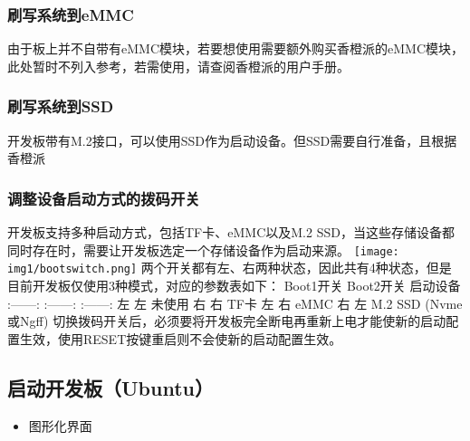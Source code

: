 \hypertarget{ux5237ux5199ux7cfbux7edfux5230emmc}{%
\subsubsection{刷写系统到eMMC}\label{ux5237ux5199ux7cfbux7edfux5230emmc}}

由于板上并不自带有eMMC模块，若要想使用需要额外购买香橙派的eMMC模块，此处暂时不列入参考，若需使用，请查阅香橙派的用户手册。

\hypertarget{ux5237ux5199ux7cfbux7edfux5230ssd}{%
\subsubsection{刷写系统到SSD}\label{ux5237ux5199ux7cfbux7edfux5230ssd}}

开发板带有M.2接口，可以使用SSD作为启动设备。但SSD需要自行准备，且根据香橙派

\hypertarget{ux8c03ux6574ux8bbeux5907ux542fux52a8ux65b9ux5f0fux7684ux62e8ux7801ux5f00ux5173}{%
\subsubsection{调整设备启动方式的拨码开关}\label{ux8c03ux6574ux8bbeux5907ux542fux52a8ux65b9ux5f0fux7684ux62e8ux7801ux5f00ux5173}}

开发板支持多种启动方式，包括TF卡、eMMC以及M.2
SSD，当这些存储设备都同时存在时，需要让开发板选定一个存储设备作为启动来源。
\texttt{[image: img1/bootswitch.png]}
两个开关都有左、右两种状态，因此共有4种状态，但是目前开发板仅使用3种模式，对应的参数表如下：
\textbar{} Boot1开关 \textbar{} Boot2开关 \textbar{} 启动设备 \textbar{}
\textbar{} :------: \textbar{} :------: \textbar{} :------: \textbar{}
\textbar{} 左 \textbar{} 左 \textbar{} 未使用 \textbar{} \textbar{} 右
\textbar{} 右 \textbar{} TF卡 \textbar{} \textbar{} 左 \textbar{} 右
\textbar{} eMMC \textbar{} \textbar{} 右 \textbar{} 左 \textbar{} M.2
SSD (Nvme或Ngff)\textbar{}
切换拨码开关后，必须要将开发板完全断电再重新上电才能使新的启动配置生效，使用RESET按键重启则不会使新的启动配置生效。

\hypertarget{ux542fux52a8ux5f00ux53d1ux677fubuntu}{%
\subsection{启动开发板（Ubuntu）}\label{ux542fux52a8ux5f00ux53d1ux677fubuntu}}

\begin{itemize}
\tightlist
\item
  图形化界面
\end{itemize}

